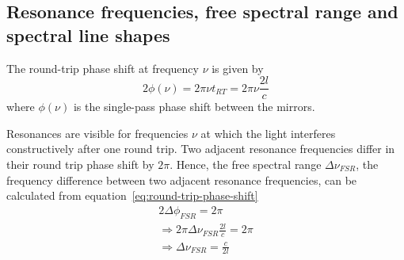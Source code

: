 \subsection{Resonance frequencies, free spectral range and spectral line shapes}
The round-trip phase shift at frequency $\nu$ is given by 
\begin{equation}
\label{eq:round-trip-phase-shift-phi}
2 \phi(\nu) = 2 \pi \nu t_{RT} = 2 \pi \nu \frac{2l}{c}
\end{equation}
where $\phi(\nu)$ is the single-pass phase shift between the mirrors.

Resonances are visible for frequencies $\nu$ at which the light interferes constructively after one round trip.
Two adjacent resonance frequencies differ in their round trip phase shift by $2 \pi$.
Hence, the free spectral range $\Delta \nu_{FSR}$, the frequency difference between two adjacent resonance frequencies, can be calculated from equation~\eqref{eq:round-trip-phase-shift}
\begin{align}
2\Delta\phi_{FSR} = 2\pi \\
\Rightarrow 2\pi\Delta\nu_{FSR}\frac{2l}{c} = 2\pi\\
\label{eq:free-spectral-range}
\Rightarrow \Delta\nu_{FSR} = \frac{c}{2l}
\end{align}

